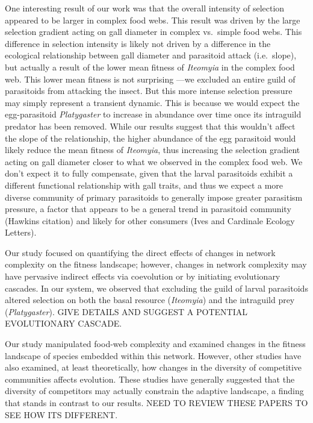 \documentclass[]{elsarticle} %
\begin{document}
One interesting result of our work was that the overall intensity of
selection appeared to be larger in complex food webs. This result was
driven by the large selection gradient acting on gall diameter in
complex vs.~simple food webs. This difference in selection intensity is
likely not driven by a difference in the ecological relationship between
gall diameter and parasitoid attack (i.e.~slope), but actually a result
of the lower mean fitness of \emph{Iteomyia} in the complex food web.
This lower mean fitness is not surprising ---we excluded an entire guild
of parasitoids from attacking the insect. But this more intense
selection pressure may simply represent a transient dynamic. This is
because we would expect the egg-parasitoid \emph{Platygaster} to
increase in abundance over time once its intraguild predator has been
removed. While our results suggest that this wouldn't affect the slope
of the relationship, the higher abundance of the egg parasitoid would
likely reduce the mean fitness of \emph{Iteomyia}, thus increasing the
selection gradient acting on gall diameter closer to what we observed in
the complex food web. We don't expect it to fully compensate, given that
the larval parasitoids exhibit a different functional relationship with
gall traits, and thus we expect a more diverse community of primary
parasitoids to generally impose greater parasitism pressure, a factor
that appears to be a general trend in parasitoid community (Hawkins
citation) and likely for other consumers (Ives and Cardinale Ecology
Letters).

Our study focused on quantifying the direct effects of changes in
network complexity on the fitness landscape; however, changes in network
complexity may have pervasive indirect effects via coevolution or by
initiating evolutionary cascades. In our system, we observed that
excluding the guild of larval parasitoids altered selection on both the
basal resource (\emph{Iteomyia}) and the intraguild prey
(\emph{Platygaster}). GIVE DETAILS AND SUGGEST A POTENTIAL EVOLUTIONARY
CASCADE.

Our study manipulated food-web complexity and examined changes in the
fitness landscape of species embedded within this network. However,
other studies have also examined, at least theoretically, how changes in
the diversity of competitive communities affects evolution. These
studies have generally suggested that the diversity of competitors may
actually constrain the adaptive landscape, a finding that stands in
contrast to our results. NEED TO REVIEW THESE PAPERS TO SEE HOW ITS
DIFFERENT.
\end{document}
